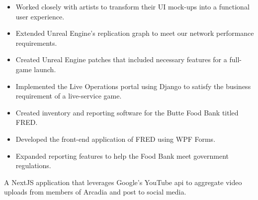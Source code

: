 \documentclass[10pt,a4paper,ragged2e,withhyper]{altacv}
\begin{document}


\divider{}

\begin{itemize}
  \item Worked closely with artists to transform their UI mock-ups into a functional user experience.
  \item Extended Unreal Engine's replication graph to meet our network performance requirements.
  \item Created Unreal Engine patches that included necessary features for a full-game launch.
  \item Implemented the Live Operations portal using Django to satisfy the business requirement of a live-service game.
\end{itemize}

\divider{}

\begin{itemize}
  \item Created inventory and reporting software for the Butte Food Bank titled FRED.\
  \item Developed the front-end application of FRED using WPF Forms.
  \item Expanded reporting features to help the Food Bank meet government regulations.
\end{itemize}


A NextJS application that leverages Google's YouTube api to aggregate video uploads from members of Arcadia and post to social media.
\end{document}
